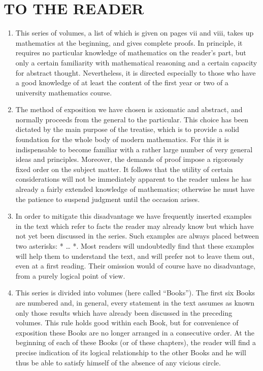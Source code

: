 \chapter*{TO THE READER}
{}

\begin{enumerate}
\def\labelenumi{\arabic{enumi}.}
\item
  This series of volumes, a list of which is given on pages vii and viii, takes up mathematics at the beginning, and gives complete proofs. In principle, it requires no particular knowledge of mathematics on the reader's part, but only a certain familiarity with mathematical reasoning and a certain capacity for abstract thought. Nevertheless, it is directed especially to those who have a good knowledge of at least the content of the first year or two of a university mathematics course.
\item
  The method of exposition we have chosen is axiomatic and abstract, and normally proceeds from the general to the particular. This choice has been dictated by the main purpose of the treatise, which is to provide a solid foundation for the whole body of modern mathematics. For this it is indispensable to become familiar with a rather large number of very general ideas and principles. Moreover, the demands of proof impose a rigorously fixed order on the subject matter. It follows that the utility of certain considerations will not be immediately apparent to the reader unless he has already a fairly extended knowledge of mathematics; otherwise he must have the patience to suspend judgment until the occasion arises.
\item
  In order to mitigate this disadvantage we have frequently inserted examples in the text which refer to facts the reader may already know but which have not yet been discussed in the series. Such examples are always placed between two asterisks: * \ldots{} *. Most readers will undoubtedly find that these examples will help them to understand the text, and will prefer not to leave them out, even at a first reading. Their omission would of course have no disadvantage, from a purely logical point of view.
\item
  This series is divided into volumes (here called ``Books''). The first six Books are numbered and, in general, every statement in the text assumes as known only those results which have already been discussed in the preceding volumes. This rule holds good within each Book, but for convenience of exposition these Books are no longer arranged in a consecutive order. At the beginning of each of these Books (or of these chapters), the reader will find a precise indication of its logical relationship to the other Books and he will thus be able to satisfy himself of the absence of any vicious circle.

\end{enumerate}
